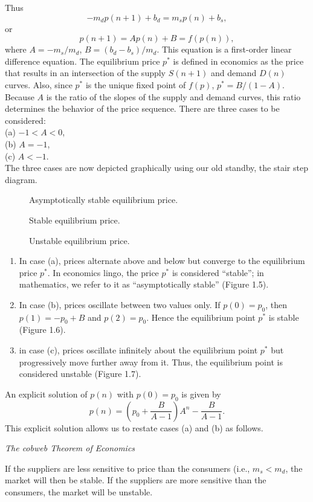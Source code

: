 \begin{eg}
Thus
\[
    -m_d p(n+1)+b_d=m_s p(n)+b_s,
\]
or
\[
    p(n+1)=Ap(n)+B=f(p(n)),
\]
where $A=-m_s/m_d$, $B=(b_d-b_s)/m_d$. This equation is a first-order linear difference equation. The equilibrium price $p^*$ is defined in economics as the price that results in an intersection of the supply $S(n+1)$ and demand $D(n)$ curves. Also, since $p^*$ is the unique fixed point of $f(p)$, $p^*=B/(1-A)$. Because $A$ is the ratio of the slopes of the supply and demand curves, this ratio determines the behavior of the price sequence. There are three cases to be considered: \\
(a) $-1<A<0$, \\
(b) $A=-1$, \\
(c) $A<-1$. \\
The three cases are now depicted graphically using our old standby, the stair step diagram.
\begin{figure}[H]
    \centering
    \caption{Asymptotically stable equilibrium price.}
\end{figure}
\begin{figure}[H]
    \centering
    \caption{Stable equilibrium price.}
\end{figure}
\begin{figure}[H]
    \centering
    \caption{Unstable equilibrium price.}
\end{figure}
\begin{enumerate}
    \item In case (a), prices alternate above and below but converge to the equilibrium price $p^*$. In economics lingo, the price $p^*$ is considered ``stable''; in mathematics, we refer to it as ``asymptotically stable'' (Figure 1.5).
    \item In case (b), prices oscillate between two values only. If $p(0)=p_0$, then $p(1)=-p_0+B$ and $p(2)=p_0$. Hence the equilibrium point $p^*$ is stable (Figure 1.6).
    \item in case (c), prices oscillate infinitely about the equilibrium point $p^*$ but progressively move further away from it. Thus, the equilibrium point is considered unstable (Figure 1.7).
\end{enumerate}

An explicit solution of $p(n)$ with $p(0)=p_0$ is given by
\[
    p(n)=\left(p_0+\frac{B}{A-1}\right)A^n-\frac{B}{A-1}.
\]
This explicit solution allows us to restate cases (a) and (b) as follows.

\textit{The cobweb Theorem of Economics}

If the suppliers are less sensitive to price than the consumers (i.e., $m_s<m_d$, the market will then be stable. If the suppliers are more sensitive than the consumers, the market will be unstable.
\end{eg}
